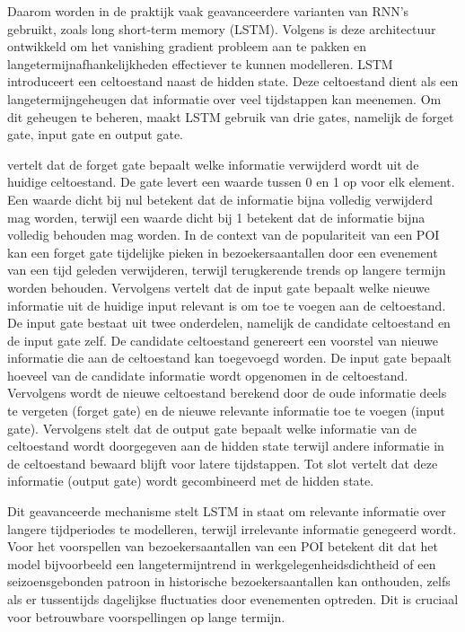 Daarom worden in de praktijk vaak geavanceerdere varianten van RNN’s gebruikt, zoals long short-term memory (LSTM). Volgens \textcite{AlSelwi2024} is deze architectuur ontwikkeld om het vanishing gradient probleem aan te pakken en langetermijnafhankelijkheden effectiever te kunnen modelleren. LSTM introduceert een celtoestand naast de hidden state. Deze celtoestand dient als een langetermijngeheugen dat informatie over veel tijdstappen kan meenemen. Om dit geheugen te beheren, maakt LSTM gebruik van drie gates, namelijk de forget gate, input gate en output gate.

\textcite{Tian2018} vertelt dat de forget gate bepaalt welke informatie verwijderd wordt uit de huidige celtoestand. De gate levert een waarde tussen 0 en 1 op voor elk element. Een waarde dicht bij nul betekent dat de informatie bijna volledig verwijderd mag worden, terwijl een waarde dicht bij 1 betekent dat de informatie bijna volledig behouden mag worden. In de context van de populariteit van een POI kan een forget gate tijdelijke pieken in bezoekersaantallen door een evenement van een tijd geleden verwijderen, terwijl terugkerende trends op langere termijn worden behouden. Vervolgens vertelt \textcite{Kratzert2018} dat de input gate bepaalt welke nieuwe informatie uit de huidige input relevant is om toe te voegen aan de celtoestand. De input gate bestaat uit twee onderdelen, namelijk de candidate celtoestand en de input gate zelf. De candidate celtoestand genereert een voorstel van nieuwe informatie die aan de celtoestand kan toegevoegd worden. De input gate bepaalt hoeveel van de candidate informatie wordt opgenomen in de celtoestand. Vervolgens wordt de nieuwe celtoestand berekend door de oude informatie deels te vergeten (forget gate) en de nieuwe relevante informatie toe te voegen (input gate). Vervolgens stelt \textcite{Tian2018} dat de output gate bepaalt welke informatie van de celtoestand wordt doorgegeven aan de hidden state terwijl andere informatie in de celtoestand bewaard blijft voor latere tijdstappen. Tot slot vertelt \textcite{Kratzert2018} dat deze informatie (output gate) wordt gecombineerd met de hidden state.

Dit geavanceerde mechanisme stelt LSTM in staat om relevante informatie over langere tijdperiodes te modelleren, terwijl irrelevante informatie genegeerd wordt. Voor het voorspellen van bezoekersaantallen van een POI betekent dit dat het model bijvoorbeeld een langetermijntrend in werkgelegenheidsdichtheid of een seizoensgebonden patroon in historische bezoekersaantallen kan onthouden, zelfs als er tussentijds dagelijkse fluctuaties door evenementen optreden. Dit is cruciaal voor betrouwbare voorspellingen op lange termijn.

